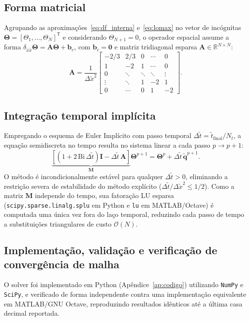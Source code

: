 \documentclass[11pt,a4paper]{article}
\begin{document}
\subsection{Forma matricial}
Agrupando as aproximações~\eqref{eq:df_interna} e~\eqref{eq:lomax} no vetor de incógnitas $\boldsymbol{\Theta} = [\Theta_1, \dots, \Theta_N]^{\mathsf{T}}$ e considerando $\Theta_{N+1} = 0$, o operador espacial assume a forma $\delta_{\tilde{x}\tilde{x}}\boldsymbol{\Theta} = \mathbf{A}\boldsymbol{\Theta} + \mathbf{b}_c$, com $\mathbf{b}_c = \mathbf{0}$ e matriz tridiagonal esparsa $\mathbf{A} \in \mathbb{R}^{N\times N}$:
\begin{equation}
    \mathbf{A} = \frac{1}{\Delta\tilde{x}^2}
    \begin{bmatrix}
        -2/3 & 2/3 & 0 & \cdots & 0 \\
        1 & -2 & 1 & \cdots & 0 \\
        0 & \ddots & \ddots & \ddots & \vdots \\
        \vdots & \ddots & 1 & -2 & 1 \\
        0 & \cdots & 0 & 1 & -2
    \end{bmatrix}.
    \label{eq:matriz_A}
\end{equation}

\subsection{Integração temporal implícita}
Empregando o esquema de Euler Implícito com passo temporal $\Delta\tilde{t} = \tilde{t}_{\text{final}} / N_t$, a equação semidiscreta no tempo resulta no sistema linear a cada passo $p \to p+1$:
\begin{equation}
    \underbrace{\left[\left(1 + 2\,\text{Bi}\,\Delta\tilde{t}\right)\mathbf{I} - \Delta\tilde{t}\,\mathbf{A}\right]}_{\mathbf{M}}\boldsymbol{\Theta}^{p+1} = \boldsymbol{\Theta}^p + \Delta\tilde{t}\,\tilde{\mathbf{q}}^{p+1}.
    \label{eq:euler_implicito}
\end{equation}
O método é incondicionalmente estável para qualquer $\Delta\tilde{t} > 0$, eliminando a restrição severa de estabilidade do método explícito ($\Delta\tilde{t}/\Delta\tilde{x}^2 \le 1/2$). Como a matriz $\mathbf{M}$ independe do tempo, sua fatoração LU esparsa (\texttt{scipy.sparse.linalg.splu} em Python e \texttt{lu} em MATLAB/Octave) é computada uma única vez fora do laço temporal, reduzindo cada passo de tempo a substituições triangulares de custo $\mathcal{O}(N)$.

\subsection{Implementação, validação e verificação de convergência de malha}
O solver foi implementado em Python (Apêndice~\ref{ap:codigo}) utilizando \texttt{NumPy} e \texttt{SciPy}, e verificado de forma independente contra uma implementação equivalente em MATLAB/GNU Octave, reproduzindo resultados idênticos até a última casa decimal reportada.
\end{document}
